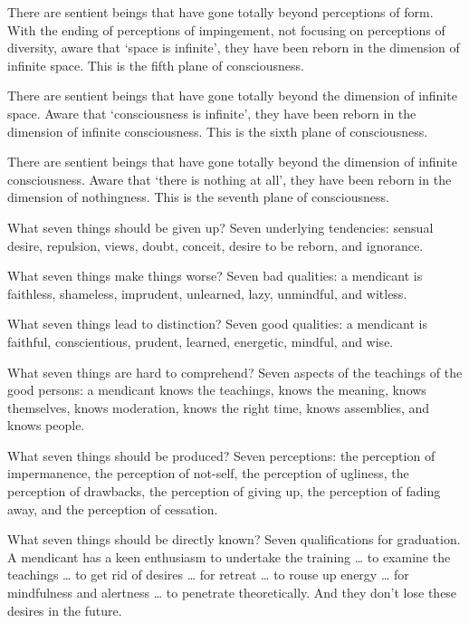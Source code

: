 \documentclass[12pt,openany]{book}%
\begin{document}
There are sentient beings that have gone totally beyond perceptions of form. With the ending of perceptions of impingement, not focusing on perceptions of diversity, aware that ‘space is infinite’, they have been reborn in the dimension of infinite space. This is the fifth plane of consciousness. 

There are sentient beings that have gone totally beyond the dimension of infinite space. Aware that ‘consciousness is infinite’, they have been reborn in the dimension of infinite consciousness. This is the sixth plane of consciousness. 

There are sentient beings that have gone totally beyond the dimension of infinite consciousness. Aware that ‘there is nothing at all’, they have been reborn in the dimension of nothingness. This is the seventh plane of consciousness. 

What seven things should be given up? Seven underlying tendencies: sensual desire, repulsion, views, doubt, conceit, desire to be reborn, and ignorance. 

What seven things make things worse? Seven bad qualities: a mendicant is faithless, shameless, imprudent, unlearned, lazy, unmindful, and witless. 

What seven things lead to distinction? Seven good qualities: a mendicant is faithful, conscientious, prudent, learned, energetic, mindful, and wise. 

What seven things are hard to comprehend? Seven aspects of the teachings of the good persons: a mendicant knows the teachings, knows the meaning, knows themselves, knows moderation, knows the right time, knows assemblies, and knows people. 

What seven things should be produced? Seven perceptions: the perception of impermanence, the perception of not-self, the perception of ugliness, the perception of drawbacks, the perception of giving up, the perception of fading away, and the perception of cessation. 

What seven things should be directly known? Seven qualifications for graduation. A mendicant has a keen enthusiasm to undertake the training … to examine the teachings … to get rid of desires … for retreat … to rouse up energy … for mindfulness and alertness … to penetrate theoretically. And they don’t lose these desires in the future. 
\end{document}
